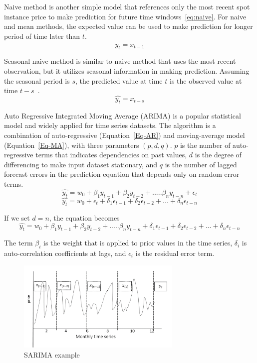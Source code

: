 \documentclass[graybox]{svmult}
\begin{document}
Naive method is another simple model that references only the most recent spot instance price to make prediction for future time windows~\ref{eq:naive}. For naive and mean methods, the expected value can be used to make prediction for longer period of time later than $t$. 
\begin{equation}
  \hat{y_{t}} = x_{t-1} 
\label{eq:naive}
\end{equation}

Seasonal naive method is similar to naive method that uses the most recent observation, but it utilizes seasonal information in making prediction. Assuming the seasonal period is $s$, the predicted value at time $t$ is the observed value at time $t-s$~\cite{time-series-analysis}.
\begin{equation}
  \hat{y_{t}} = x_{t-s} 
\label{smean}
\end{equation}

Auto Regressive Integrated Moving Average (ARIMA) is a popular statistical model and widely applied for time series datasets. The algorithm is a combination of auto-regressive (Equation~\ref{Eq-AR}) and moving-average model (Equation~\ref{Eq-MA}), with three parameters  \((p,d,q)\). \(p\) is the number of auto-regressive terms that indicates dependencies on past values, \(d\) is the degree of differencing to make input dataset stationary, and \(q\) is the number of lagged forecast errors in the prediction equation that depends only on random error terms.
\begin{equation}
\hat{y_t} = w_0 +\beta_1 y_{t-1}+ \beta_2 y_{t-2}+.....\beta_n y_{t-n}+\epsilon_t
\label{Eq-AR}
\end{equation}
\begin{equation}
\hat{y_t} = w_0 +\epsilon_t + \delta_1 \epsilon_{t-1}+  \delta_2 \epsilon_{t-2}+...+ \delta_n \epsilon_{t-n}
\label{Eq-MA}
\end{equation}

If we set \(d = n\), the equation becomes 
\begin{equation}
\hat{y_t} = w_0 +\beta_1 y_{t-1}+ \beta_2 y_{t-2}+.....\beta_n y_{t-n} +  \delta_1 \epsilon_{t-1}+  \delta_2 \epsilon_{t-2}+...+ \delta_n \epsilon_{t-n}
\label{Eq-ARIMA}
\end{equation}

The term \(\beta_i \) is the weight that is applied to prior values in the time series, \(\delta_i \) is auto-correlation coefficients at lags, and \(\epsilon_i \) is the residual error term.

\begin{figure}
\centering\includegraphics[width=0.7\textwidth]{figures/sarima.png}\caption{SARIMA example}\label{fig:sarima}
\end{figure}
\end{document}
